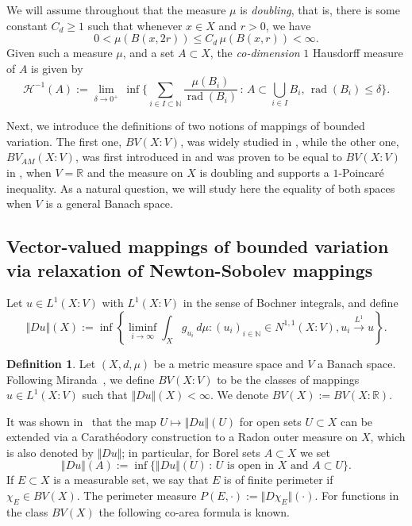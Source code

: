\documentclass[11pt, letterpaper]{amsart} %
\newcommand*{\R}{{\mathbb R}}
\newcommand*{\N}{{\mathbb N}}
\DeclareMathOperator{\rad}{rad}
\numberwithin{equation}{section}
\theoremstyle{plain}
\theoremstyle{definition}
\newtheorem{definition}[equation]{Definition}
\begin{document}
{We will assume throughout that the measure $\mu$ is \emph{doubling}, that is, there is some
constant $C_d\ge 1$ such that whenever $x\in X$ and $r>0$, we have
\[
0<\mu(B(x,2r))\le C_d\, \mu(B(x,r))<\infty.
\]
Given such a measure $\mu$, and a set $A\subset X$, the \emph{co-dimension} $1$ Hausdorff measure
of $A$ is given by
\[
\mathcal{H}^{-1}(A):=\lim_{\delta\to 0^+}\, \inf\bigg\lbrace \sum_{i\in I\subset \N}\frac{\mu(B_i)}{\rad(B_i)}\, 
  :\, A\subset\bigcup_{i\in I}B_i,\, \rad(B_i)\le \delta\bigg\rbrace.
\]

Next, we introduce the definitions of two notions of mappings of bounded variation. The first one, $BV(X:V)$, 
was widely studied in \cite{Miranda}, 
while the other one, $BV_{AM}(X:V)$, was first introduced in \cite{Martio} and was proven to be equal 
to $BV(X:V)$ in \cite{DEKS}, when $V=\R$ and the measure on $X$ is doubling and supports a $1$-Poincar\'e inequality. 
As a natural question, we will study here the equality of both spaces when $V$ is a general Banach space.


\subsection{Vector-valued mappings of bounded variation via relaxation of Newton-Sobolev mappings}

Let $u\in L^1(X:V)$ with $L^1(X:V)$ in the sense of Bochner integrals, and define
\[
\Vert Du\Vert (X):=\inf\left\{ \liminf_{i\to\infty}\int_Xg_{u_i}\, d\mu:(u_i)_{i\in\N}\in N^{1,1}(X:V), u_i\overset{L^1}{\rightarrow}u\right\}.
\]

\begin{definition}\label{def:Miranda}
Let $(X,d,\mu )$ be a metric measure space and $V$ a Banach space. Following Miranda~\cite{Miranda}, we 
define $BV(X:V)$ to be the classes of mappings $u\in L^1(X:V)$ such that $\Vert Du\Vert (X)<\infty$. 
We denote $BV(X):=BV(X:\R )$.
\end{definition}

It was shown in~\cite{Miranda} that the map $U\mapsto \Vert Du\Vert(U)$ for open sets $U\subset X$ can be extended via
a Carath\'eodory construction to a Radon outer measure on $X$, which is also denoted by $\Vert Du\Vert$; in particular, for
Borel sets $A\subset X$ we set
\[
\Vert Du\Vert(A):=\inf\{\Vert Du\Vert(U)\, :\, U\text{ is open in }X \text{ and }A\subset U\}.
\]
If $E\subset X$ is a measurable set, we say that $E$ is of finite perimeter if $\chi_E\in BV(X)$. The perimeter measure
$P(E,\cdot):=\Vert D\chi_E\Vert(\cdot)$.
For functions in the class $BV(X)$ the following co-area formula is known.

}
\end{document}

